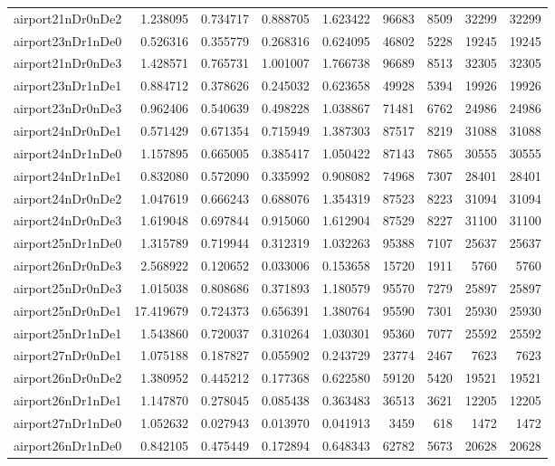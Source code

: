 \begin{longtable}{|l|r|r|r|r|r|r|r|r|}
airport21nDr0nDe2 & 1.238095 & 0.734717 & 0.888705 & 1.623422 & 96683 & 8509 & 32299 & 32299 \\
airport23nDr1nDe0 & 0.526316 & 0.355779 & 0.268316 & 0.624095 & 46802 & 5228 & 19245 & 19245 \\
airport21nDr0nDe3 & 1.428571 & 0.765731 & 1.001007 & 1.766738 & 96689 & 8513 & 32305 & 32305 \\
airport23nDr1nDe1 & 0.884712 & 0.378626 & 0.245032 & 0.623658 & 49928 & 5394 & 19926 & 19926 \\
airport23nDr0nDe3 & 0.962406 & 0.540639 & 0.498228 & 1.038867 & 71481 & 6762 & 24986 & 24986 \\
airport24nDr0nDe1 & 0.571429 & 0.671354 & 0.715949 & 1.387303 & 87517 & 8219 & 31088 & 31088 \\
airport24nDr1nDe0 & 1.157895 & 0.665005 & 0.385417 & 1.050422 & 87143 & 7865 & 30555 & 30555 \\
airport24nDr1nDe1 & 0.832080 & 0.572090 & 0.335992 & 0.908082 & 74968 & 7307 & 28401 & 28401 \\
airport24nDr0nDe2 & 1.047619 & 0.666243 & 0.688076 & 1.354319 & 87523 & 8223 & 31094 & 31094 \\
airport24nDr0nDe3 & 1.619048 & 0.697844 & 0.915060 & 1.612904 & 87529 & 8227 & 31100 & 31100 \\
airport25nDr1nDe0 & 1.315789 & 0.719944 & 0.312319 & 1.032263 & 95388 & 7107 & 25637 & 25637 \\
airport26nDr0nDe3 & 2.568922 & 0.120652 & 0.033006 & 0.153658 & 15720 & 1911 & 5760 & 5760 \\
airport25nDr0nDe3 & 1.015038 & 0.808686 & 0.371893 & 1.180579 & 95570 & 7279 & 25897 & 25897 \\
airport25nDr0nDe1 & 17.419679 & 0.724373 & 0.656391 & 1.380764 & 95590 & 7301 & 25930 & 25930 \\
airport25nDr1nDe1 & 1.543860 & 0.720037 & 0.310264 & 1.030301 & 95360 & 7077 & 25592 & 25592 \\
airport27nDr0nDe1 & 1.075188 & 0.187827 & 0.055902 & 0.243729 & 23774 & 2467 & 7623 & 7623 \\
airport26nDr0nDe2 & 1.380952 & 0.445212 & 0.177368 & 0.622580 & 59120 & 5420 & 19521 & 19521 \\
airport26nDr1nDe1 & 1.147870 & 0.278045 & 0.085438 & 0.363483 & 36513 & 3621 & 12205 & 12205 \\
airport27nDr1nDe0 & 1.052632 & 0.027943 & 0.013970 & 0.041913 & 3459 & 618 & 1472 & 1472 \\
airport26nDr1nDe0 & 0.842105 & 0.475449 & 0.172894 & 0.648343 & 62782 & 5673 & 20628 & 20628 \\

\end{longtable}
